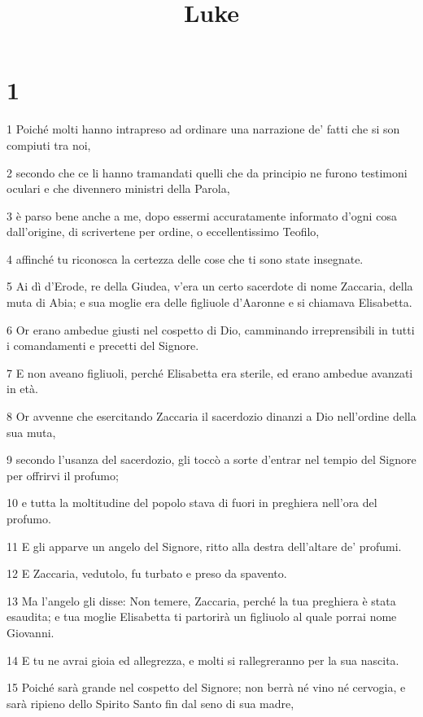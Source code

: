 

\title{Luke}


\chapter{1}

\par 1 Poiché molti hanno intrapreso ad ordinare una narrazione de' fatti che si son compiuti tra noi,
\par 2 secondo che ce li hanno tramandati quelli che da principio ne furono testimoni oculari e che divennero ministri della Parola,
\par 3 è parso bene anche a me, dopo essermi accuratamente informato d'ogni cosa dall'origine, di scrivertene per ordine, o eccellentissimo Teofilo,
\par 4 affinché tu riconosca la certezza delle cose che ti sono state insegnate.
\par 5 Ai dì d'Erode, re della Giudea, v'era un certo sacerdote di nome Zaccaria, della muta di Abia; e sua moglie era delle figliuole d'Aaronne e si chiamava Elisabetta.
\par 6 Or erano ambedue giusti nel cospetto di Dio, camminando irreprensibili in tutti i comandamenti e precetti del Signore.
\par 7 E non aveano figliuoli, perché Elisabetta era sterile, ed erano ambedue avanzati in età.
\par 8 Or avvenne che esercitando Zaccaria il sacerdozio dinanzi a Dio nell'ordine della sua muta,
\par 9 secondo l'usanza del sacerdozio, gli toccò a sorte d'entrar nel tempio del Signore per offrirvi il profumo;
\par 10 e tutta la moltitudine del popolo stava di fuori in preghiera nell'ora del profumo.
\par 11 E gli apparve un angelo del Signore, ritto alla destra dell'altare de' profumi.
\par 12 E Zaccaria, vedutolo, fu turbato e preso da spavento.
\par 13 Ma l'angelo gli disse: Non temere, Zaccaria, perché la tua preghiera è stata esaudita; e tua moglie Elisabetta ti partorirà un figliuolo al quale porrai nome Giovanni.
\par 14 E tu ne avrai gioia ed allegrezza, e molti si rallegreranno per la sua nascita.
\par 15 Poiché sarà grande nel cospetto del Signore; non berrà né vino né cervogia, e sarà ripieno dello Spirito Santo fin dal seno di sua madre,
